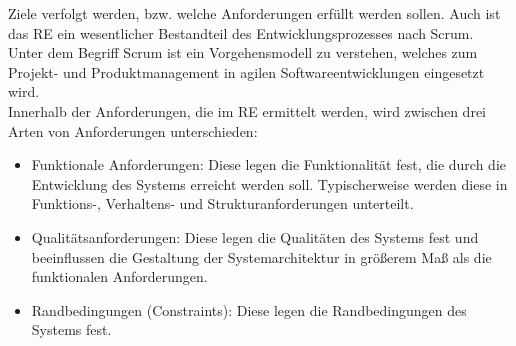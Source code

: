     Ziele verfolgt werden, bzw. welche Anforderungen erfüllt werden sollen. Auch ist das \acl{RE} ein wesentlicher 
    Bestandteil des Entwicklungsprozesses nach Scrum. Unter dem Begriff Scrum ist ein Vorgehensmodell zu verstehen, 
    welches zum Projekt- und Produktmanagement in agilen Softwareentwicklungen eingesetzt wird. 
    \\
    \linebreak
    Innerhalb der Anforderungen, die im \acl{RE} ermittelt werden, wird zwischen drei Arten von Anforderungen unterschieden: 
    \begin{itemize}
        \item Funktionale Anforderungen: Diese legen die Funktionalität fest, die durch die Entwicklung des Systems 
            erreicht werden soll. Typischerweise werden diese in Funktions-, Verhaltens- und Strukturanforderungen unterteilt.
        \item Qualitätsanforderungen: Diese legen die Qualitäten des Systems fest und beeinflussen die Gestaltung der 
            Systemarchitektur in größerem Maß als die funktionalen Anforderungen.
        \item Randbedingungen (Constraints): Diese legen die Randbedingungen des Systems fest.
    \end{itemize}